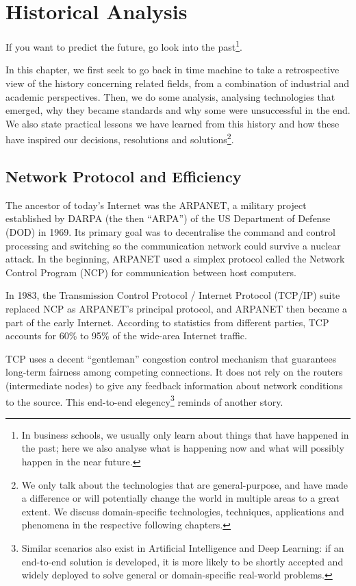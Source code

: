 \chapter{Historical Analysis}\label{sec-his-analysis}
If you want to predict the future, go look into the past\footnote{In business schools, we usually only learn about things that have happened in the past; here we also analyse what is happening now and what will possibly happen in the near future.}. 

In this chapter, we first seek to go back in time machine to take a retrospective view of the history concerning related fields, from a combination of industrial and academic perspectives. Then, we do some analysis, analysing technologies that emerged, why they became standards and why some were unsuccessful in the end. We also state practical lessons we have learned from this history and how these have inspired our decisions, resolutions and solutions\footnote{We only talk about the technologies that are general-purpose, and have made a difference or will potentially change the world in multiple areas to a great extent. We discuss domain-specific technologies, techniques, applications and phenomena in the respective following chapters.}.

\section{Network Protocol and Efficiency}\label{sec-his-analysis-tcp}
The ancestor of today's Internet was the ARPANET, a military project established by DARPA (the then ``ARPA'') of the US Department of Defense (DOD) in 1969. Its primary goal was to decentralise the command and control processing and switching so the communication network could survive a nuclear attack. In the beginning, ARPANET used a simplex protocol called the Network Control Program (NCP) for communication between host computers. 

In 1983, the Transmission Control Protocol / Internet Protocol (TCP/IP) suite replaced NCP as ARPANET's principal protocol, and ARPANET then became a part of the early Internet. According to statistics from different parties, TCP accounts for 60\% to 95\% of the wide-area Internet traffic. 

TCP uses a decent ``gentleman'' congestion control mechanism \cite{Chiu:1989:AIMD} that guarantees long-term fairness among competing connections. It does not rely on the routers (intermediate nodes) to give any feedback information about network conditions to the source. This end-to-end elegency\footnote{Similar scenarios also exist in Artificial Intelligence and Deep Learning: if an end-to-end solution is developed, it is more likely to be shortly accepted and widely deployed to solve general or domain-specific real-world problems.} reminds of another story. 

